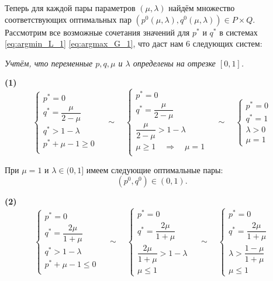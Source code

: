 
\hspace{5mm}

Теперь для каждой пары параметров $(\mu, \lambda)$ найдём множество
соответствующих оптимальных пар 
$(p^0(\mu, \lambda), q^0(\mu, \lambda)) \in P \times Q$. 
Рассмотрим все возможные сочетания значений для $p^*$ и $q^*$ в системах 
\eqref{eq:argmin_L_1} \eqref{eq:argmax_G_1}, что даст нам 6 следующих систем:

\hspace{3mm}

	\textit{Учтём, что переменные $p, q, \mu$ и $\lambda$ определены на отрезке $[0, 1]$.}
	
\textbf{(1)}
$$
	\begin{cases}
		p^* = 0 \\
		q^* = \dfrac{\mu}{2 - \mu} \\
		q^* > 1 - \lambda \\
		p^* + \mu - 1 \geqslant 0 \\
	\end{cases}
	\quad \sim \quad
	\begin{cases}
		p^* = 0 \\
		q^* = \dfrac{\mu}{2 - \mu} \\
		\dfrac{\mu}{2 - \mu} > 1 - \lambda \\
		\mu \geqslant 1 \quad \Rightarrow \quad \mu = 1 \\
	\end{cases}
	\quad \sim \quad
	\begin{cases}
		p^* = 0 \\
		q^* = 1 \\
		\lambda > 0 \\
		\mu = 1
	\end{cases}
$$

При $\mu = 1$  и $\lambda \in (0,1]$ имеем следующие оптимальные пары:
$$
	(p^0, q^0) \in (0, 1).
$$

\textbf{(2)}
$$
	\begin{cases}
		p^* = 0 \\
		q^* = \dfrac{2\mu}{1+\mu} \\
		q^* > 1 - \lambda \\
		p^* + \mu - 1 \leqslant 0 \\
	\end{cases}
	\quad \sim \quad
	\begin{cases}
		p^* = 0 \\
		q^* = \dfrac{2\mu}{1+\mu} \\
		\dfrac{2\mu}{1+\mu} > 1 - \lambda \\
		\mu \leqslant 1
	\end{cases}
	\quad \sim \quad
	\begin{cases}
		p^* = 0 \\
		q^* = \dfrac{2\mu}{1+\mu} \\
		\lambda > \dfrac{1-\mu}{1+\mu} \\
		\mu \leqslant 1
	\end{cases}
$$

